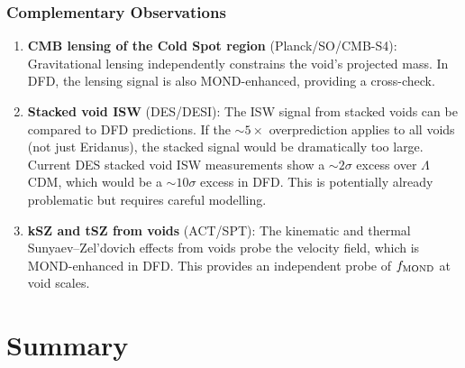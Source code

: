 \documentclass[11pt,a4paper]{article}
\newcommand{\LCDM}{$\Lambda$CDM}
\begin{document}
\section{Complementary Observations}

\begin{enumerate}
\item \textbf{CMB lensing of the Cold Spot region} (Planck/SO/CMB-S4):
  Gravitational lensing independently constrains the void's projected
  mass. In DFD, the lensing signal is also MOND-enhanced, providing
  a cross-check.

\item \textbf{Stacked void ISW} (DES/DESI): The ISW signal from
  stacked voids can be compared to DFD predictions. If the $\sim 5\times$
  overprediction applies to all voids (not just Eridanus), the
  stacked signal would be dramatically too large. Current DES
  stacked void ISW measurements show a $\sim 2\sigma$ excess over
  \LCDM, which would be a $\sim 10\sigma$ excess in DFD. This is
  potentially already problematic but requires careful modelling.

\item \textbf{kSZ and tSZ from voids} (ACT/SPT): The kinematic and
  thermal Sunyaev--Zel'dovich effects from voids probe the velocity
  field, which is MOND-enhanced in DFD. This provides an independent
  probe of $f_{\rm MOND}$ at void scales.
\end{enumerate}


\part{Summary}
\label{part:summary}
\end{document}
